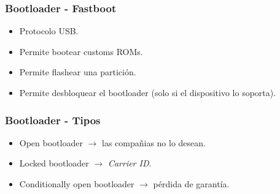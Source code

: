 \begin{frame}
  \frametitle{Bootloader - Fastboot}
  \begin{itemize}
      \item Protocolo USB.
      
      \item Permite bootear customs ROMs.
      
      \item Permite flashear una partición.     
      
      \item Permite desbloquear el bootloader (solo si el dispositivo lo soporta).      
  \end{itemize}
\end{frame}

\begin{frame}
  \frametitle{Bootloader - Tipos}
  \begin{itemize}
      \item Open bootloader $\rightarrow$ las compañias no lo desean.
      
      \item Locked bootloader $\rightarrow$ \textit{Carrier ID}.
      
      \item Conditionally open bootloader $\rightarrow$ pérdida de garantía.      
  \end{itemize}
\end{frame}

